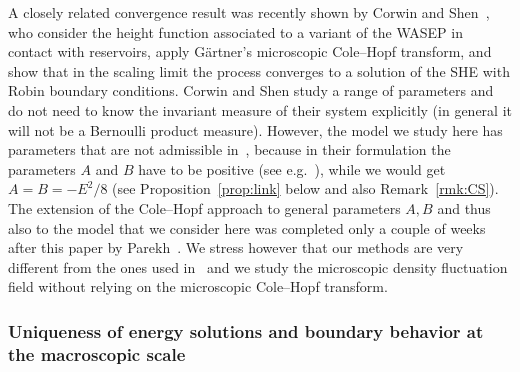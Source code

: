 \documentclass[10pt]{amsart}
\theoremstyle{definition}\newtheorem{defi}[theo]{Definition}\newtheorem{rema}[theo]{Remark}\newtheorem{exam}[theo]{Example}\newtheorem{exem}[theo]{Example}\newtheorem{nota}[theo]{Notation}
\begin{document}
A closely related convergence result was recently shown by Corwin and Shen~\cite{Corwin2016}, who consider the height function associated to a variant of the WASEP in contact with reservoirs, apply G\"artner's microscopic Cole--Hopf transform, and show that in the scaling limit the process converges to a solution of the SHE with Robin boundary conditions. Corwin and Shen study a range of parameters and do not need to know the invariant measure of their system explicitly (in general it will not be a Bernoulli product measure). However, the model we study here has parameters that are not admissible in~\cite{Corwin2016}, because in their formulation the parameters $A$ and $B$ have to be positive (see e.g.~\cite[Proposition~2.7 and p.~14]{Corwin2016}), while we would get $A = B = -E^2/8$ (see Proposition~\ref{prop:link} below and also Remark~\ref{rmk:CS}). The extension of the Cole--Hopf approach to general parameters $A,B$ and thus also to the model that we consider here was completed only a couple of weeks after this paper by Parekh~\cite{Parekh2017}. We stress however that our methods are very different from the ones used in~\cite{Corwin2016, Parekh2017} and we study the microscopic density fluctuation field without relying on the microscopic Cole--Hopf transform.


\subsubsection{Uniqueness of energy solutions and boundary behavior at the macroscopic scale}
\end{document}
